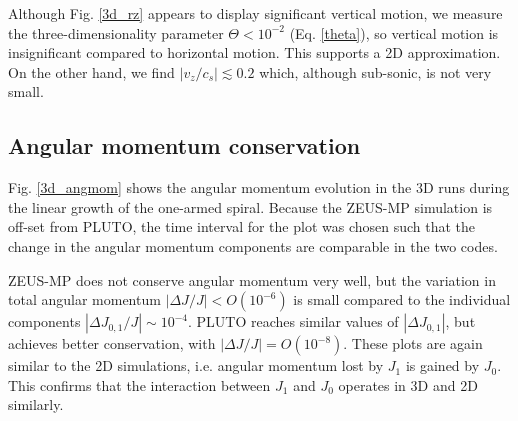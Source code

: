 Although Fig. \ref{3d_rz} appears to display significant vertical motion,
we measure the three-dimensionality parameter $\Theta < 10^{-2}$
(Eq. \ref{theta}), so vertical motion is insignificant compared to
horizontal motion. This supports a 2D approximation. On the other
hand, we find  $|v_z/c_s|\lesssim 0.2$ which, although sub-sonic, is
not very small.  


\subsection{Angular momentum conservation}   
Fig. \ref{3d_angmom} shows the angular momentum evolution in the 3D 
runs during the linear growth of the one-armed spiral. Because the
ZEUS-MP simulation is off-set from PLUTO, the time interval for the
plot was chosen such that the change in the angular momentum
components are comparable in the two codes. 

ZEUS-MP does not conserve angular momentum very well, but the
variation in total angular momentum $|\Delta J/J|< O(10^{-6})$ is
small compared to the individual components $|\Delta J_{0,1}/J|\sim
10^{-4}$. %
PLUTO reaches similar values of $|\Delta J_{0,1}|$, but achieves better
conservation, with $|\Delta J/J|=O(10^{-8})$. These plots are again
similar to the 2D simulations, i.e. angular momentum lost by $J_1$ is
gained by $J_0$. This confirms that the interaction between $J_1$ and
$J_0$ operates in 3D and 2D similarly.  

